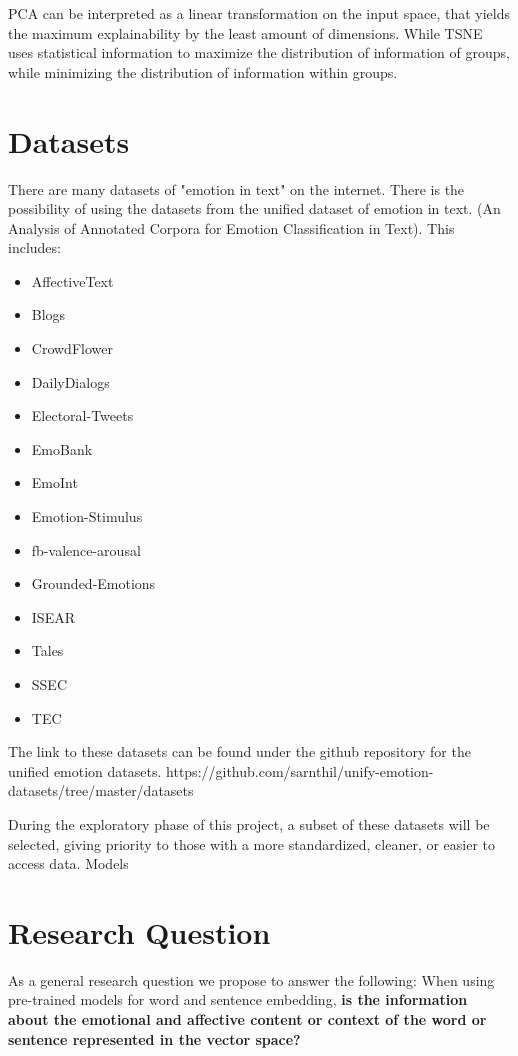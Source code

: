 PCA can be interpreted as a linear transformation on the input space, that yields the maximum explainability by the least amount of dimensions. While TSNE uses statistical information to maximize the distribution of information of groups, while minimizing the distribution of information within groups.

\section{Datasets}\label{sec:Datasets}
There are many datasets of "emotion in text" on the internet. 
There is the possibility of using the datasets from the unified dataset of emotion in text. (An Analysis of Annotated Corpora for Emotion Classification in Text). This includes:
\begin{itemize}
  \item AffectiveText
  \item Blogs
  \item CrowdFlower
  \item DailyDialogs
  \item Electoral-Tweets
  \item EmoBank
  \item EmoInt
  \item Emotion-Stimulus
  \item fb-valence-arousal
  \item Grounded-Emotions
  \item ISEAR
  \item Tales
  \item SSEC
  \item TEC
\end{itemize}


The link to these datasets can be found under the github repository for the unified emotion datasets.
https://github.com/sarnthil/unify-emotion-datasets/tree/master/datasets

During the exploratory phase of this project, a subset of these datasets will be selected, giving priority to those with a more standardized, cleaner, or easier to access data.
Models

\section{Research Question}\label{sec:Research Question}

As a general research question we propose to answer the following:
When using pre-trained models for word and sentence embedding, \textbf{is the information about the emotional and affective content or context of the word or sentence represented in the vector space?}

